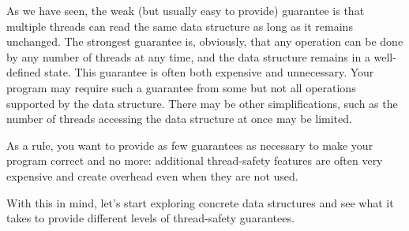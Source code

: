 As we have seen, the weak (but usually easy to provide) guarantee is that multiple threads can read the same data structure as long as it remains unchanged. The strongest guarantee is, obviously, that any operation can be done by any number of threads at any time, and the data structure remains in a well-defined state. This guarantee is often both expensive and unnecessary. Your program may require such a guarantee from some but not all operations supported by the data structure. There may be other simplifications, such as the number of threads accessing the data structure at once may be limited.

As a rule, you want to provide as few guarantees as necessary to make your program correct and no more: additional thread-safety features are often very expensive and create overhead even when they are not used.

With this in mind, let's start exploring concrete data structures and see what it takes to provide different levels of thread-safety guarantees.

































